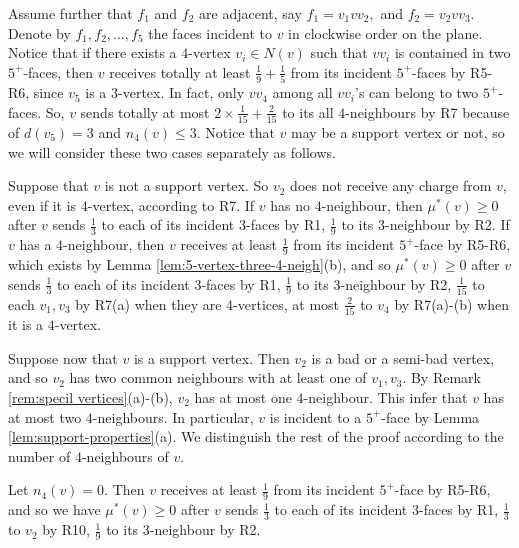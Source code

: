 \documentclass[12pt, reqno]{amsart}
\theoremstyle{plain}
\theoremstyle{definition}
\numberwithin{equation}{section}
\begin{document}
Assume further that $f_1$ and $f_2$ are adjacent, say $f_1=v_1vv_2,$ and $f_2=v_2vv_3$.  Denote by $f_1,f_2,\ldots,f_5$ the faces incident to $v$ in clockwise order on the plane.  Notice that if there exists a $4$-vertex $v_i\in N(v)$ such that $vv_i$ is contained in two $5^+$-faces, then $v$ receives totally at least $\frac{1}{9}+\frac{1}{5}$ from its incident $5^+$-faces by R5-R6, since $v_5$ is a $3$-vertex. In fact, only $vv_4$ among all $vv_i$'s can belong to two $5^+$-faces. So, $v$ sends totally at most  $2\times \frac{1}{15}+\frac{2}{15}$ to its all $4$-neighbours by R7 because of $d(v_5)=3$ and $n_4(v)\leq 3$. Notice that $v$ may be a support vertex or not, so we will consider these two cases separately as follows.
 

Suppose that $v$ is not a support vertex. So $v_2$ does not receive any charge from $v$, even if it is $4$-vertex, according to R7. If $v$ has no $4$-neighbour, then  $\mu^*(v) \geq 0$ after $v$ sends $\frac{1}{3}$ to each of its incident $3$-faces by R1, $\frac{1}{9}$ to its $3$-neighbour by R2. If $v$ has a $4$-neighbour, then  $v$ receives at least $\frac{1}{9}$ from its incident $5^+$-face by R5-R6, which exists by Lemma \ref{lem:5-vertex-three-4-neigh}(b), and so $\mu^*(v) \geq 0$ after $v$ sends $\frac{1}{3}$ to each of its incident $3$-faces by R1, $\frac{1}{9}$ to its $3$-neighbour by R2, $\frac{1}{15}$ to each $v_1,v_3$ by R7(a) when they are $4$-vertices, at most  $\frac{2}{15}$ to $v_4$ by R7(a)-(b) when it is a $4$-vertex.

Suppose now that $v$ is a support vertex. Then $v_2$ is a bad or a semi-bad vertex, and so $v_2$ has two common neighbours with at least one of $v_1,v_3$. By Remark \ref{rem:specil vertices}(a)-(b), $v_2$ has at most one $4$-neighbour. This infer that $v$ has at most two $4$-neighbours. %
In particular, $v$ is incident to a $5^+$-face by Lemma \ref{lem:support-properties}(a). 
We distinguish the rest of the proof according to the number of $4$-neighbours of $v$.

Let $n_4(v)=0$. Then $v$ receives at least $\frac{1}{9}$ from its incident $5^+$-face by R5-R6, and so we have $\mu^*(v)\geq 0$  after $v$ sends $\frac{1}{3}$ to each of its incident $3$-faces by R1, $\frac{1}{3}$ to $v_2$ by R10, $\frac{1}{9}$ to its $3$-neighbour by R2.
\end{document}
